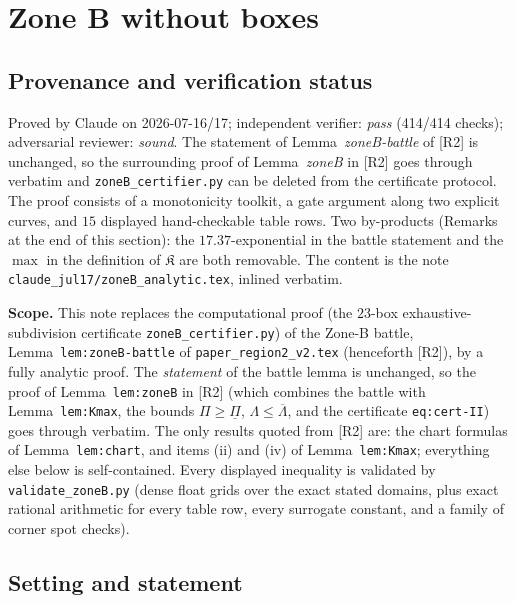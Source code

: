 \documentclass[11pt]{article}
\theoremstyle{remark}
\theoremstyle{plain}
\theoremstyle{plain}
\newcommand{\RII}{[R2]}
\begin{document}
\section{Zone B without boxes}\label{sec:zoneB}

\subsection*{Provenance and verification status}
Proved by Claude on 2026-07-16/17; independent verifier: \emph{pass}
(414/414 checks); adversarial reviewer: \emph{sound}.  The statement of
Lemma~\emph{zoneB-battle} of [R2] is unchanged, so the surrounding proof
of Lemma~\emph{zoneB} in [R2] goes through verbatim and
\texttt{zoneB\_certifier.py} can be deleted from the certificate
protocol.  The proof consists of a monotonicity toolkit, a gate argument
along two explicit curves, and $15$ displayed hand-checkable table rows.
Two by-products (Remarks at the end of this section): the
$17.37$-exponential in the battle statement and the $\max$ in the
definition of $\mathfrak K$ are both removable.  The content is the note
\texttt{claude\_jul17/zoneB\_analytic.tex}, inlined verbatim.

\noindent
\textbf{Scope.}  This note replaces the computational proof (the
$23$-box exhaustive-subdivision certificate \texttt{zoneB\_certifier.py})
of the Zone-B battle, Lemma~\texttt{lem:zoneB-battle} of
\texttt{paper\_region2\_v2.tex} (henceforth \RII), by a fully analytic
proof.  The \emph{statement} of the battle lemma is unchanged, so the proof
of Lemma~\texttt{lem:zoneB} in \RII{} (which combines the battle with
Lemma~\texttt{lem:Kmax}, the bounds
$\Pi\ge\underline\Pi$, $\Lambda\le\overline\Lambda$, and the certificate
\texttt{eq:cert-II}) goes through verbatim.  The only results quoted from
\RII{} are: the chart formulas of Lemma~\texttt{lem:chart}, and items (ii)
and (iv) of Lemma~\texttt{lem:Kmax}; everything else below is
self-contained.  Every displayed inequality is validated by
\texttt{validate\_zoneB.py} (dense float grids over the exact stated
domains, plus exact rational arithmetic for every table row, every
surrogate constant, and a family of corner spot checks).

\subsection{Setting and statement}
\end{document}
